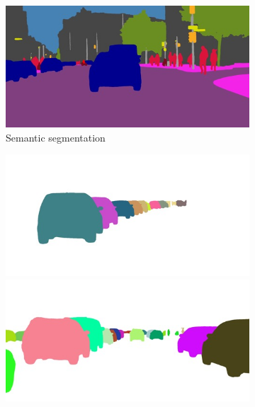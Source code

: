 {\begin{figure}[t]
{{\begin{subfigure}[t]{0.24\linewidth}
\begin{center}
		\includegraphics[width=\linewidth,trim={0px 60px 0 0px},clip]{qualitative/munich_000316_000019_semantic_segmentation_rgb.jpg}
  \caption{Semantic segmentation}
\end{center}
\end{subfigure}
\begin{subfigure}[t]{0.24\linewidth}
\begin{center}
		\includegraphics[width=\linewidth,trim={0px 60px 0 0px},clip]{qualitative/bielefeld_000000_026296_instance_segmentation.jpg}
		\includegraphics[width=\linewidth,trim={0px 60px 0 0px},clip]{qualitative/berlin_000008_000019_instance_segmentation.jpg}

\end{center}
\end{subfigure}}}
\end{figure}}
